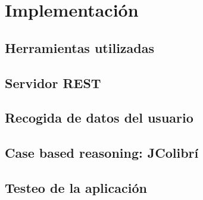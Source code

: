 \section {Implementación}
\subsection {Herramientas utilizadas}
\subsection {Servidor REST}
\subsection {Recogida de datos del usuario}
\subsection {Case based reasoning: JColibrí}
\subsection {Testeo de la aplicación}
